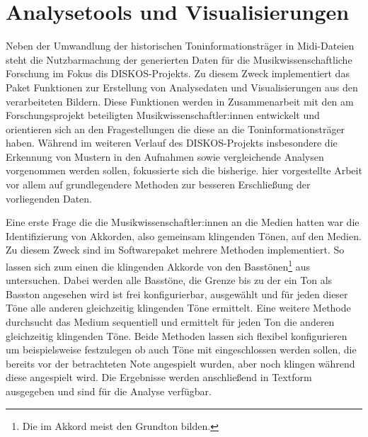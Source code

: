 \FloatBarrier
\section{Analysetools und Visualisierungen}

Neben der Umwandlung der historischen Toninformationsträger in Midi-Dateien steht die Nutzbarmachung der generierten Daten für die Musikwissenschaftliche Forschung im Fokus dis DISKOS-Projekts.
Zu diesem Zweck implementiert das  Paket Funktionen zur Erstellung von Analysedaten und Visualisierungen aus den verarbeiteten Bildern.
Diese Funktionen werden in Zusammenarbeit mit den am Forschungsprojekt beteiligten Musikwissenschaftler:innen entwickelt und orientieren sich an den Fragestellungen die diese an die Toninformationsträger haben.
Während im weiteren Verlauf des DISKOS-Projekts insbesondere die Erkennung von Mustern in den Aufnahmen sowie vergleichende Analysen vorgenommen werden sollen, fokussierte sich die bisherige. hier vorgestellte Arbeit vor allem auf grundlegendere Methoden zur besseren Erschließung der vorliegenden Daten.

Eine erste Frage die die Musikwissenschaftler:innen an die Medien hatten war die Identifizierung von Akkorden, also gemeinsam klingenden Tönen, auf den Medien.
Zu diesem Zweck sind im Softwarepaket mehrere Methoden implementiert.
So lassen sich zum einen die klingenden Akkorde von den Basstönen\footnote{Die im Akkord meist den Grundton bilden.} aus untersuchen.
Dabei werden alle Basstöne, die Grenze bis zu der ein Ton als Basston angesehen wird ist frei konfigurierbar, ausgewählt und für jeden dieser Töne alle anderen gleichzeitig klingenden Töne ermittelt.
Eine weitere Methode durchsucht das Medium sequentiell und ermittelt für jeden Ton die anderen gleichzeitig klingenden Töne.
Beide Methoden lassen sich flexibel konfigurieren um beispielsweise festzulegen ob auch Töne mit eingeschlossen werden sollen, die bereits vor der betrachteten Note angespielt wurden, aber noch klingen während diese angespielt wird.
Die Ergebnisse werden anschließend in Textform ausgegeben und sind für die Analyse verfügbar.

